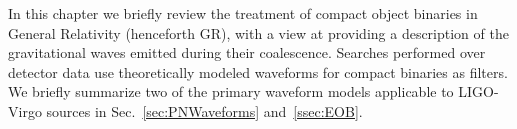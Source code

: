 
\newcommand{\cd}{\nabla}
\newcommand{\pd}{\partial}
\newcommand{\Reals}{\mathcal{R}}
\newcommand{\defeq}{\mathrel{\mathop:}=}
\newcommand{\hbarr}{\bar{h}}
\newcommand{\Tbar}{\bar{T}}
\newcommand{\Quad}{\mathcal{Q}}
\newcommand{\vecx}{\mathbf{x}}
\newcommand{\vecr}{\mathbf{r}}

In this chapter we briefly review the treatment of compact object
binaries in General Relativity (henceforth GR), with a view at providing a 
description of the gravitational waves emitted during their coalescence. 
Searches performed over 
detector data use theoretically modeled waveforms for compact binaries as 
filters. We briefly summarize two of the primary waveform models applicable
to LIGO-Virgo sources in Sec.~\ref{sec:PNWaveforms} and~\ref{ssec:EOB}.


